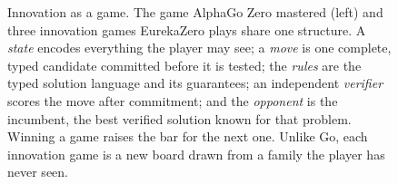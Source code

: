 \begin{figure}[t]
\centering

\caption{Innovation as a game. The game AlphaGo Zero mastered (left) and three innovation games
EurekaZero plays share one structure. A \emph{state} encodes everything the player may see; a
\emph{move} is one complete, typed candidate committed before it is tested; the \emph{rules} are the
typed solution language and its guarantees; an independent \emph{verifier} scores the move after
commitment; and the \emph{opponent} is the incumbent, the best verified solution known for that
problem. Winning a game raises the bar for the next one. Unlike Go, each innovation game is a new
board drawn from a family the player has never seen.}
\label{fig:game}
\end{figure}
